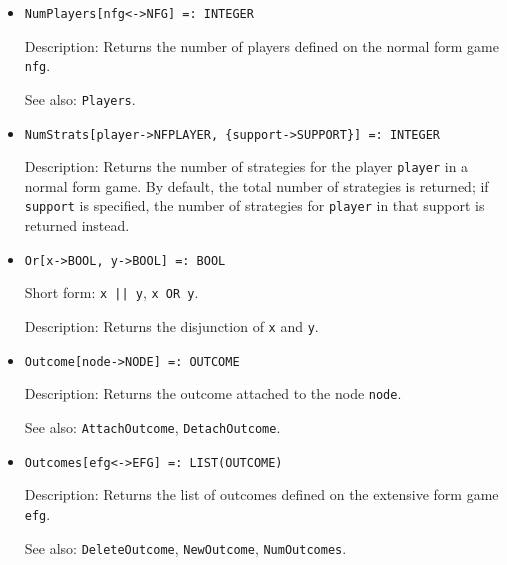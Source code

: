 \begin{itemize}
\item
\protect \large \begin{verbatim}
NumPlayers[nfg<->NFG] =: INTEGER
\end{verbatim} \normalsize

\bd
\item
[Description:] Returns the number of players defined on the normal form
game \verb+nfg+.
\item
[See also:] {\tt Players}.
\ed

\item
\protect \large \begin{verbatim}
NumStrats[player->NFPLAYER, {support->SUPPORT}] =: INTEGER
\end{verbatim}\normalsize

\bd
\item
[Description:] Returns the number of strategies for the player \verb+player+
in a normal form game.  By default, the total number of strategies is
returned; if \verb+support+ is specified, the number of strategies
for \verb+player+ in that support is returned instead.
\ed


\item 
\protect \large \begin{verbatim}
Or[x->BOOL, y->BOOL] =: BOOL
\end{verbatim} \normalsize
  
\bd
\item
[Short form:] \verb+x || y+, \verb+x OR y+.
\item
[Description:] Returns the disjunction of \verb+x+ and \verb+y+.
\ed

\item
\protect \large \begin{verbatim}
Outcome[node->NODE] =: OUTCOME
\end{verbatim}\normalsize

\bd
\item
[Description:] Returns the outcome attached to the node \verb+node+.
\item
[See also:] {\tt AttachOutcome}, {\tt DetachOutcome}.
\ed

\item
\protect \large \begin{verbatim}
Outcomes[efg<->EFG] =: LIST(OUTCOME)
\end{verbatim}\normalsize

\bd
\item
[Description:] Returns the list of outcomes defined on the extensive form
game \verb+efg+.
\item
[See also:] {\tt DeleteOutcome}, {\tt NewOutcome}, {\tt NumOutcomes}.
\ed


\end{itemize}
